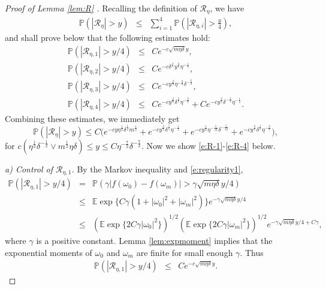 \documentclass[12pt]{amsart}
\theoremstyle{definition}
\theoremstyle{remark}
\numberwithin{equation}{section}
\newcommand{\E}{\mathbb{E}}            %
\newcommand{\PP}{\mathbb{P}}
\begin{document}
\begin{proof}[Proof of Lemma \ref{lem:R} ]
	Recalling the definition of $\mathcal{R}_\eta$, we have
	\begin{eqnarray*}
		\PP(|\mathcal{R}_\eta|>y)&\le&\sum_{i=1}^4\PP(|\mathcal{R}_{\eta,i}|>\frac{y}{4}),
	\end{eqnarray*}
	and shall prove below that the following estimates hold:
	\begin{eqnarray}
		\PP(|\mathcal{R}_{\eta,1}|>y/4)&\le &C e^{-c \sqrt{m\eta\delta}y}, \label{e:R-1} \\
		\PP\left(\left\vert\mathcal{R}_{\eta,2}\right\vert>y/4\right) &\le & Ce^{-c\delta^\frac15 y^\frac25\eta^{-\frac1{5}}}, \label{e:R-2} \\
		\PP\left(\left\vert\mathcal{R}_{\eta,3}\right\vert >y/4\right)& \le & Ce^{-cy^{\frac29}\eta^{-\frac29}\delta^{-\frac29} }, \label{e:R-3}\\
		\PP\left(\left\vert\mathcal{R}_{\eta,4}\right\vert >y/4\right)& \le &	Ce^{-cy^{\frac27}\delta^{\frac17}\eta^{-\frac37}}+Ce^{-cy^{\frac25}\delta^{-\frac15}\eta^{-\frac15}}. \label{e:R-4}
	\end{eqnarray}
	Combining these estimates, we immediately get
	\begin{equation*}
		\PP(|\mathcal{R}_\eta|>y)\le C\Big( e^{-cy\eta^{\frac12}\delta^\frac12m^{\frac12} }
		+e^{-cy^\frac25\delta^\frac15 \eta^{-\frac1{5}}}
		+e^{-cy^{\frac16}\eta^{-\frac5{12}}\delta^{-\frac5{12}} }
		+e^{-cy^{\frac27}\delta^{\frac17}\eta^{-\frac37}}\Big),
	\end{equation*}
	for $c(\eta^{\frac12}\delta^{-\frac12}\vee m^{\frac12}\eta\delta)\le y\le C\eta^{-\frac72}\delta^{-\frac72}$. Now we show \eqref{e:R-1}-\eqref{e:R-4} below. 
	
	\textit{a) Control of $\mathcal{R}_{\eta,1}$.}
	By the Markov inequality and \eqref{e:regularity1},
	\begin{eqnarray*}
		\PP(|\mathcal{R}_{\eta,1}|>y/4)&=&\PP(\gamma|f(\omega_0)-f(\omega_m)|>\gamma \sqrt{m\eta\delta}y/4)\\
		&\le& \E\exp\{C\gamma(1+|\omega_0|^2+|\omega_m|^2)\}e^{-\gamma \sqrt{m\eta\delta}y/4}\\
		&\le& (\E\exp\{2C\gamma|\omega_0|^2\})^{1/2}(\E\exp\{2C\gamma|\omega_m|^2\})^{1/2}e^{-\gamma\sqrt{m\eta\delta}y/4+C\gamma},
	\end{eqnarray*}	
	where $\gamma$ is a positive constant. Lemma \ref{lem:expmoment} implies that the exponential moments of $\omega_0$ and $\omega_m$ are finite for small enough $\gamma$. Thus
	\begin{eqnarray*}
		\PP(|\mathcal{R}_{\eta,1}|>y/4)
		&\le& C e^{-c \sqrt{m\eta\delta}y}.
	\end{eqnarray*}	
	

\end{proof}
\end{document}
